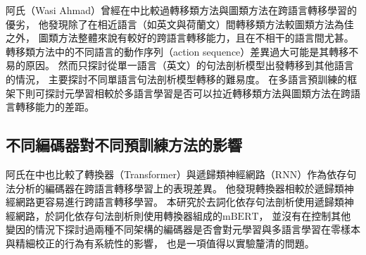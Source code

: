 阿氏（Wasi Ahmad）曾經在\cite{ahmad-etal-2019-difficulties}中比較過轉移類方法與圖類方法在跨語言轉移學習的優劣，
他發現除了在相近語言（如英文與荷蘭文）間轉移類方法較圖類方法為佳之外，
圖類方法整體來說有較好的跨語言轉移能力，且在不相干的語言間尤甚。
轉移類方法中的不同語言的動作序列（action sequence）差異過大可能是其轉移不易的原因。
然而\cite{ahmad-etal-2019-difficulties}只探討從單一語言（英文）的句法剖析模型出發轉移到其他語言的情況，
主要探討不同單語言句法剖析模型轉移的難易度。
在多語言預訓練的框架下則可探討元學習相較於多語言學習是否可以拉近轉移類方法與圖類方法在跨語言轉移能力的差距。

\subsection{不同編碼器對不同預訓練方法的影響}
阿氏在\cite{ahmad-etal-2019-difficulties}中也比較了轉換器（Transformer）與遞歸類神經網路（RNN）作為依存句法分析的編碼器在跨語言轉移學習上的表現差異。
他發現轉換器相較於遞歸類神經網路更容易進行跨語言轉移學習。
本研究於去詞化依存句法剖析使用遞歸類神經網路，於詞化依存句法剖析則使用轉換器組成的$\mathrm{mBERT}$，
並沒有在控制其他變因的情況下探討過兩種不同架構的編碼器是否會對元學習與多語言學習在零樣本與精細校正的行為有系統性的影響，
也是一項值得以實驗釐清的問題。
